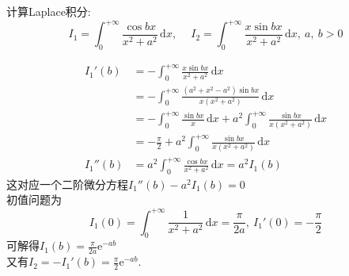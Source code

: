 	\newpage
	\begin{problem}
		计算Laplace积分:
		$$I_1=\int_{0}^{+\infty}\frac{\cos bx}{x^2+a^2}\,\mathrm{d}x,\ \quad I_2=\int_{0}^{+\infty}\frac{x\sin bx}{x^2+a^2}\,\mathrm{d}x,\ a,\ b>0$$
	\end{problem}
	\begin{solution}
		\begin{align*}
			I_1'(b)&=-\int_{0}^{+\infty}\frac{x\sin bx}{x^2+a^2}\,\mathrm{d}x\\
			&=-\int_{0}^{+\infty}\frac{(a^2+x^2-a^2)\sin bx}{x(x^2+a^2)}\,\mathrm{d}x\\
			&=-\int_{0}^{+\infty}\frac{\sin bx}{x}\,\mathrm{d}x+a^2\int_{0}^{+\infty}\frac{\sin bx}{x(x^2+a^2)}\,\mathrm{d}x\\
			&=-\frac{\pi}{2}+a^2\int_{0}^{+\infty}\frac{\sin bx}{x(x^2+a^2)}\,\mathrm{d}x\\
			I_1''(b)&=a^2\int_{0}^{+\infty}\frac{\cos bx}{x^2+a^2}\,\mathrm{d}x=a^2I_1(b)
		\end{align*}
	这对应一个二阶微分方程$I_1''(b)-a^2I_1(b)=0$\\
	初值问题为
	$$I_1(0)=\int_{0}^{+\infty}\frac{1}{x^2+a^2}\,\mathrm{d}x=\frac{\pi}{2a},\ I_1'(0)=-\frac{\pi}{2}$$
	可解得$I_1(b)=\frac{\pi}{2a}\mathrm{e}^{-ab}$\\
	又有$I_2=-I_1'(b)=\frac{\pi}{2}\mathrm{e}^{-ab}.$\\

\end{solution}
